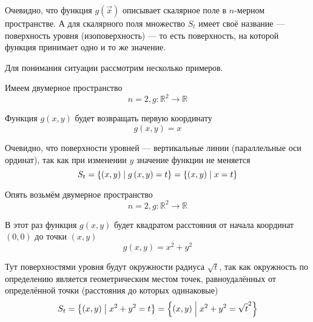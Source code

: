 Очевидно, что функция $g\left( \vec{x} \right)$
описывает скалярное поле в $n$-мерном пространстве.
А для скалярного поля множество $S_t$
имеет своё название --- поверхность уровня (изоповерхность) --- то есть
поверхность, на которой функция принимает одно и то же значение.

Для понимания ситуации рассмотрим несколько примеров.

\begin{example}
  Имеем двумерное пространство
  $$n=2, g: \mathbb{R}^2 \rightarrow \mathbb{R}$$

  Функция $g\left( x, y \right)$ будет возвращать первую координату
  $$g\left( x, y \right) = x$$

  Очевидно, что поверхности уровней --- вертикальные линии
  (параллельные оси ординат), так как при изменении $y$
  значение функции не меняется
  $$S_t
      = \left\{ \left( x, y \right) \;\middle|\; g\left( x, y \right) = t \right\}
      = \left\{ \left( x, y \right) \;\middle|\; x = t \right\}$$
\end{example}

\begin{example}
  Опять возьмём двумерное пространство
  $$n=2, g: \mathbb{R}^2 \rightarrow \mathbb{R}$$

  В этот раз функция $g\left( x, y \right)$ будет квадратом расстояния
  от начала координат $\left( 0, 0 \right)$ до точки $\left( x, y \right)$
  $$g\left( x, y \right) = x^2 + y^2$$

  Тут поверхностями уровня будут окружности радиуса $\sqrt{t}$,
  так как окружность по определению является геометрическим местом точек,
  равноудалённых от определённой точки (расстояния до которых одинаковые)
  $$S_t
      = \left\{ \left( x, y \right) \;\middle|\; x^2 + y^2 = t \right\}
      = \left\{ \left( x, y \right) \;\middle|\; x^2 + y^2 = \sqrt{t}^2 \right\}$$
\end{example}

